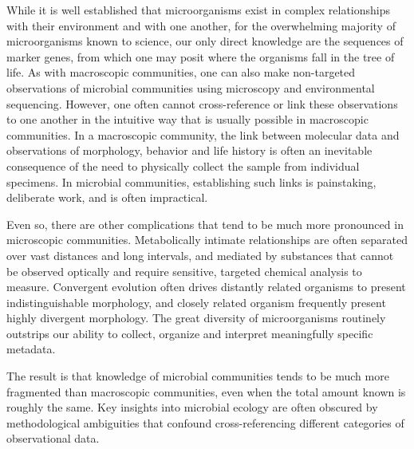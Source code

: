 While it is well established that microorganisms exist in complex relationships with their environment and with one another, for the overwhelming majority of microorganisms known to science, our only direct knowledge are the sequences of marker genes, from which one may posit where the organisms fall in the tree of life. As with macroscopic communities, one can also make non-targeted observations of microbial communities using microscopy and environmental sequencing. However, one often cannot cross-reference or link these observations to one another in the intuitive way that is usually possible in macroscopic communities. In a macroscopic community, the link between molecular data and observations of morphology, behavior and life history is often an inevitable consequence of the need to physically collect the sample from individual specimens. In microbial communities, establishing such links is painstaking, deliberate work, and is often impractical.

Even so, there are other complications that tend to be much more pronounced in microscopic communities. Metabolically intimate relationships are often separated over vast distances and long intervals, and mediated by substances that cannot be observed optically and require sensitive, targeted chemical analysis to measure. Convergent evolution often drives distantly related organisms to present indistinguishable morphology, and closely related organism frequently present highly divergent morphology. The great diversity of microorganisms routinely outstrips our ability to collect, organize and interpret meaningfully specific metadata.

The result is that knowledge of microbial communities tends to be much more fragmented than macroscopic communities, even when the total amount known is roughly the same. Key insights into microbial ecology are often obscured by methodological ambiguities that confound cross-referencing different categories of observational data. 

